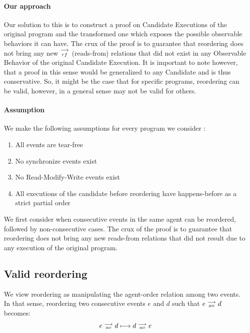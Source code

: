     \paragraph{Our approach}
    Our solution to this is to construct a proof on Candidate Executions of the original program and the transformed one which exposes the possible observable behaviors it can have.   
    The crux of the proof is to guarantee that reordering does not bring any new $\stackrel{\longrightarrow}{_{rf}}$ (reads-from) relations that did not exist in any Observable Behavior of the original Candidate Execution. 
    It is important to note however, that a proof in this sense would be generalized to any Candidate and is thus conservative.
    So, it might be the case that for specific programs, reordering can be valid, however, in a general sense may not be valid for others. 

    \paragraph{Assumption}
    We make the following assumptions for every program we consider :
    \begin{enumerate}
        \item All events are tear-free
        \item No synchronize events exist
        \item No Read-Modify-Write events exist
        \item All executions of the candidate before reordering have happens-before as a strict partial order
    \end{enumerate}
    
    We first consider when consecutive events in the same agent can be reordered, followed by non-consecutive cases. The crux of the proof is to guarantee that reordering does not bring any new reads-from relations that did not result due to any execution of the original program. 
    

    

    

\subsection{Valid reordering}
    We view reordering as manipulating the agent-order relation among two events. In that sense, reordering two consecutive events $e$ and $d$ such that $e \stackrel{\longrightarrow}{_{ao}} d$ becomes:
    \[
        e \stackrel{\longrightarrow}{_{ao}} d 
        \longmapsto
        d \stackrel{\longrightarrow}{_{ao}} e 
    \]

